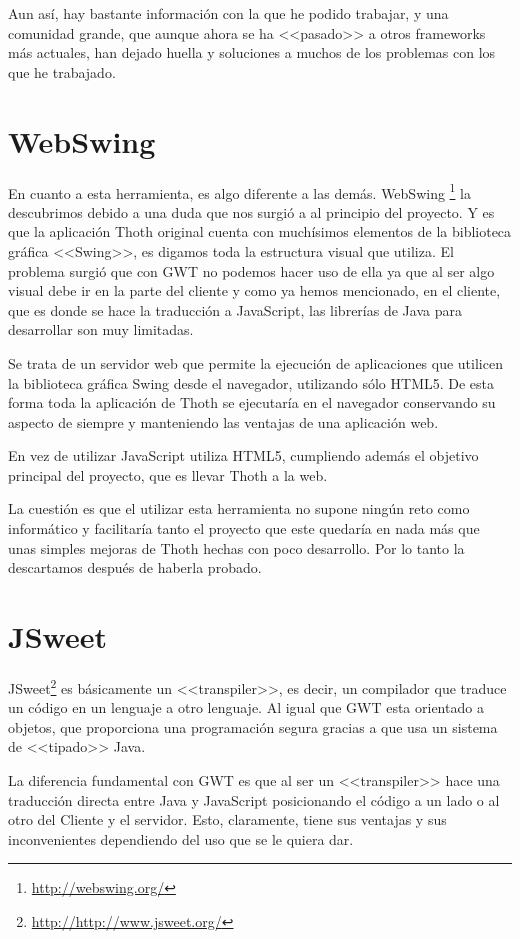 Aun así, hay bastante información con la que he podido trabajar, y una comunidad grande, que aunque ahora se ha <<pasado>> a otros frameworks más actuales, han dejado huella y soluciones a muchos de los problemas con los que he trabajado.

\section{WebSwing}

En cuanto a esta herramienta, es algo diferente a las demás. WebSwing \footnote{\url{http://webswing.org/}} la descubrimos debido a una duda que nos surgió a al principio del proyecto. Y es que la aplicación Thoth original cuenta con muchísimos elementos de la biblioteca gráfica <<Swing>>, es digamos toda la estructura visual que utiliza. El problema surgió que con GWT no podemos hacer uso de ella ya que al ser algo visual debe ir en la parte del cliente y como ya hemos mencionado, en el cliente, que es donde se hace la traducción a JavaScript, las librerías de Java para desarrollar son muy limitadas. 

Se trata de un servidor web que permite la ejecución de aplicaciones que utilicen la biblioteca gráfica Swing desde el navegador, utilizando sólo HTML5. De esta forma toda la aplicación de Thoth se ejecutaría en el navegador conservando su aspecto de siempre y manteniendo las ventajas de una aplicación web.

En vez de utilizar JavaScript utiliza HTML5, cumpliendo además el objetivo principal del proyecto, que es llevar Thoth a la web.

La cuestión es que el utilizar esta herramienta no supone ningún reto como informático y facilitaría tanto el proyecto que este quedaría en nada más que unas simples mejoras de Thoth hechas con poco desarrollo. Por lo tanto la descartamos después de haberla probado.

\section{JSweet} 

JSweet\footnote{\url{http://http://www.jsweet.org/}} es básicamente un <<transpiler>>, es decir, un compilador que traduce un código en un lenguaje a otro lenguaje. Al igual que GWT esta orientado a objetos, que proporciona una programación segura gracias a que usa un sistema de <<tipado>> Java.

La diferencia fundamental con GWT es que al ser un <<transpiler>> hace una traducción directa entre Java y JavaScript posicionando el código a un lado o al otro del Cliente y el servidor. Esto, claramente, tiene sus ventajas y sus inconvenientes dependiendo del uso que se le quiera dar. 

